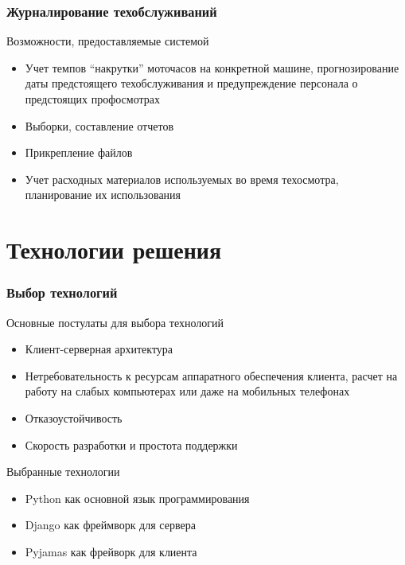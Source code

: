 \documentclass{beamer}
\begin{document}
\begin{frame}
\frametitle{Журналирование техобслуживаний}
	\begin{block}{Возможности, предоставляемые системой}
		\begin{itemize}
		  \item Учет темпов ``накрутки'' моточасов на конкретной машине,
		  прогнозирование даты предстоящего техобслуживания и предупреждение персонала
		  о предстоящих профосмотрах
		  \item Выборки, составление отчетов
		  \item Прикрепление файлов
		  \item Учет расходных материалов используемых во время техосмотра,
		  планирование их использования

	  	\end{itemize}
	\end{block}
\end{frame}



\section{Технологии решения}

\begin{frame}
\frametitle{Выбор технологий}
	\begin{block}{Основные постулаты для выбора технологий}
		\begin{itemize}
			\item Клиент-серверная архитектура
			\item Нетребовательность к ресурсам аппаратного обеспечения клиента, расчет на
			работу на слабых компьютерах или даже на мобильных телефонах
			\item Отказоустойчивость
			\item Скорость разработки и простота поддержки
		\end{itemize}
	\end{block}
	\begin{block}{Выбранные технологии}
		\begin{itemize}
		  \item Python как основной язык программирования
		  \item Django как фреймворк для сервера
		  \item Pyjamas как фрейворк для клиента
		\end{itemize}
	\end{block}
\end{frame}
\end{document}
